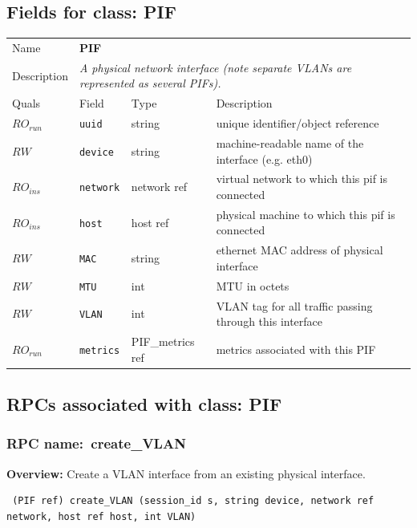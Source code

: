 \subsection{Fields for class: PIF}
\begin{longtable}{|lllp{}|}
\hline
\multicolumn{1}{|l}{Name} & \multicolumn{3}{l|}{\bf PIF} \\
\multicolumn{1}{|l}{Description} & \multicolumn{3}{l|}{\parbox{11cm}{\em A
physical network interface (note separate VLANs are represented as several
PIFs).}} \\
\hline
Quals & Field & Type & Description \\
\hline
$\mathit{RO}_\mathit{run}$ &  {\tt uuid} & string & unique identifier/object reference \\
$\mathit{RW}$ &  {\tt device} & string & machine-readable name of the interface (e.g. eth0) \\
$\mathit{RO}_\mathit{ins}$ &  {\tt network} & network ref & virtual network to which this pif is connected \\
$\mathit{RO}_\mathit{ins}$ &  {\tt host} & host ref & physical machine to which this pif is connected \\
$\mathit{RW}$ &  {\tt MAC} & string & ethernet MAC address of physical interface \\
$\mathit{RW}$ &  {\tt MTU} & int & MTU in octets \\
$\mathit{RW}$ &  {\tt VLAN} & int & VLAN tag for all traffic passing through this interface \\
$\mathit{RO}_\mathit{run}$ &  {\tt metrics} & PIF\_metrics ref & metrics associated with this PIF \\
\hline
\end{longtable}
\subsection{RPCs associated with class: PIF}
\subsubsection{RPC name:~create\_VLAN}

{\bf Overview:} 
Create a VLAN interface from an existing physical interface.

\begin{verbatim} (PIF ref) create_VLAN (session_id s, string device, network ref network, host ref host, int VLAN)\end{verbatim}


